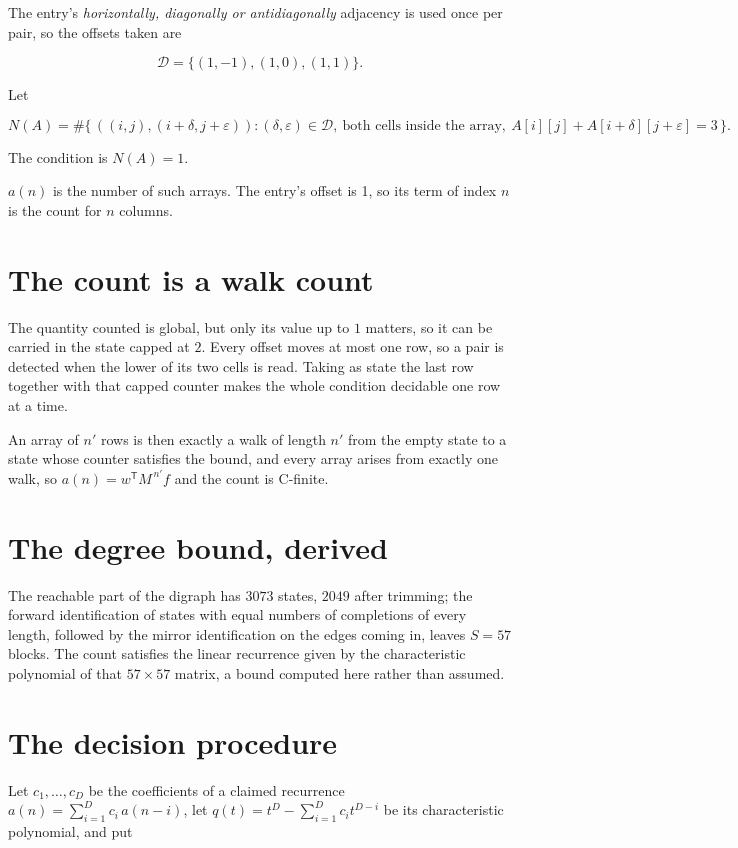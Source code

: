 \documentclass[11pt]{article}
\theoremstyle{definition}
\begin{document}
The entry's {\itshape horizontally, diagonally or antidiagonally} adjacency is used once per pair, so the offsets taken are

\[\mathcal{D} = \{(1,-1), (1,0), (1,1)\}.\]

Let

\[N(A) = \#\bigl\{\,((i,j),(i{+}\delta,j{+}\varepsilon)) : (\delta,\varepsilon) \in \mathcal{D},\ \text{both cells inside the array},\ A[i][j] + A[i{+}\delta][j{+}\varepsilon] = 3\,\bigr\}.\]

The condition is $N(A) = 1$.

$a(n)$ is the number of such arrays. The entry's offset is 1, so its term of index $n$ is the count for $n$ columns.

\section{The count is a walk count}

The quantity counted is global, but only its value up to $1$ matters, so it can be carried in the state capped at $2$. Every offset moves at most one row, so a pair is detected when the lower of its two cells is read. Taking as state the last row together with that capped counter makes the whole condition decidable one row at a time.

An array of $n'$ rows is then exactly a walk of length $n'$ from the empty state to a state whose counter satisfies the bound, and every array arises from exactly one walk, so $a(n) = w^{\mathsf T}M^{\,n'}f$ and the count is C-finite.

\section{The degree bound, derived}

The reachable part of the digraph has $3073$ states, $2049$ after trimming; the forward identification of states with equal numbers of completions of every length, followed by the mirror identification on the edges coming in, leaves $S = 57$ blocks. The count satisfies the linear recurrence given by the characteristic polynomial of that $57\times57$ matrix, a bound computed here rather than assumed.

\section{The decision procedure}

Let $c_1,\dots,c_D$ be the coefficients of a claimed recurrence $a(n) = \sum_{i=1}^{D} c_i\,a(n-i)$, let $q(t) = t^{D} - \sum_{i=1}^{D} c_i t^{D-i}$ be its characteristic polynomial, and put
\end{document}
